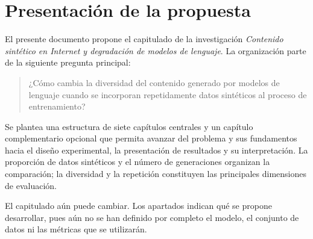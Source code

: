 \documentclass[12pt,letterpaper]{article}
\begin{document}
\section*{Presentación de la propuesta}
El presente documento propone el capitulado de la investigación
\textit{Contenido sintético en Internet y degradación de modelos de lenguaje}.
La organización parte de la siguiente pregunta principal:
\begin{quote}
¿Cómo cambia la diversidad del contenido generado por modelos de lenguaje
cuando se incorporan repetidamente datos sintéticos al proceso de entrenamiento?
\end{quote}
Se plantea una estructura de siete capítulos centrales y un capítulo
complementario opcional que permita avanzar del problema y sus fundamentos
hacia el diseño experimental, la presentación de resultados y su
interpretación. La proporción de datos sintéticos y el número de
generaciones organizan la comparación; la diversidad y la repetición
constituyen las principales dimensiones de evaluación.

El capitulado aún puede cambiar. Los apartados indican qué se propone
desarrollar, pues aún no se han definido por completo el modelo, el conjunto
de datos ni las métricas que se utilizarán.
\end{document}
